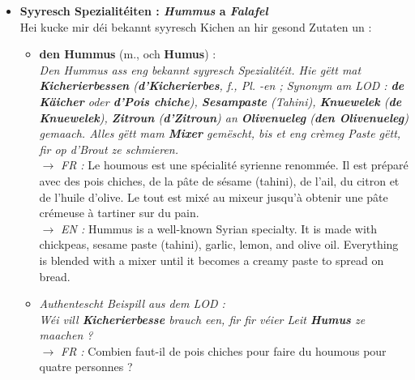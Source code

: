 \begin{itemize}
\begin{itemize}
        $\rightarrow$ \textit{FR :} D'autres personnes mangent une tartine classique au beurre avec de la confiture ou du fromage, un croissant ou du saumon, mais certains évitent le pain le matin, car le sucre et les glucides donnent vite faim. \\
        $\rightarrow$ \textit{EN :} Other people eat a classic slice of bread with butter and jam or cheese, a croissant, or salmon, but some avoid bread in the morning because sugar and carbohydrates quickly make you hungry.
    \end{itemize}

    \vspace{0.4em}

    \item \textbf{Syyresch Spezialitéiten : \textit{Hummus} a \textit{Falafel}} \\
    Hei kucke mir déi bekannt syyresch Kichen an hir gesond Zutaten un :
    \begin{itemize}
        \item \textbf{den Hummus} (m., och \textbf{Humus}) : \\
        \textit{Den Hummus ass eng bekannt syyresch Spezialitéit. Hie gëtt mat \textbf{Kicherierbessen} (\textbf{d'Kicherierbes}, f., Pl. \textit{-en} ; Synonym am LOD : \textbf{de Käicher} oder \textbf{d'Pois chiche}), \textbf{Sesampaste} (Tahini), \textbf{Knuewelek} (\textbf{de Knuewelek}), \textbf{Zitroun} (\textbf{d'Zitroun}) an \textbf{Olivenueleg} (\textbf{den Olivenueleg}) gemaach. Alles gëtt mam \textbf{Mixer} gemëscht, bis et eng crèmeg Paste gëtt, fir op d'Brout ze schmieren.} \\
        $\rightarrow$ \textit{FR :} Le houmous est une spécialité syrienne renommée. Il est préparé avec des pois chiches, de la pâte de sésame (tahini), de l'ail, du citron et de l'huile d'olive. Le tout est mixé au mixeur jusqu'à obtenir une pâte crémeuse à tartiner sur du pain. \\
        $\rightarrow$ \textit{EN :} Hummus is a well-known Syrian specialty. It is made with chickpeas, sesame paste (tahini), garlic, lemon, and olive oil. Everything is blended with a mixer until it becomes a creamy paste to spread on bread.
        \item \textit{Authentescht Beispill aus dem LOD :} \\
        \textit{Wéi vill \textbf{Kicherierbesse} brauch een, fir fir véier Leit \textbf{Humus} ze maachen ?} \\
        $\rightarrow$ \textit{FR :} Combien faut-il de pois chiches pour faire du houmous pour quatre personnes ? \\

\end{itemize}
\end{itemize}
